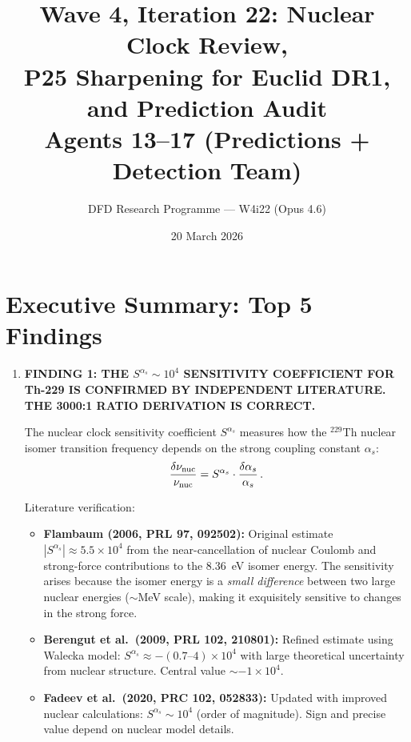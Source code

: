 \documentclass[11pt]{article}
\title{\textbf{Wave 4, Iteration 22: Nuclear Clock Review,\\
P25 Sharpening for Euclid DR1, and Prediction Audit}\\[12pt]
{\large Agents 13--17 (Predictions + Detection Team)}}
\author{DFD Research Programme --- W4i22 (Opus 4.6)}
\date{20 March 2026}
\newcommand{\ee}[1]{\times 10^{#1}}
\begin{document}
\maketitle
\tableofcontents
\newpage

\section*{Executive Summary: Top 5 Findings}

\begin{tcolorbox}[colback=blue!5!white, colframe=blue!70!black,
  title=\textbf{W4i22 TOP 5 FINDINGS --- PREDICTIONS TEAM}]

\begin{enumerate}

\item \textbf{FINDING 1: THE $S^{\alpha_s} \sim 10^4$ SENSITIVITY COEFFICIENT
  FOR Th-229 IS CONFIRMED BY INDEPENDENT LITERATURE. THE 3000:1 RATIO
  DERIVATION IS CORRECT.}

  The nuclear clock sensitivity coefficient $S^{\alpha_s}$ measures how
  the $^{229}$Th nuclear isomer transition frequency depends on the
  strong coupling constant $\alpha_s$:
  \begin{equation}
  \frac{\delta\nu_{\rm nuc}}{\nu_{\rm nuc}}
  = S^{\alpha_s}\cdot\frac{\delta\alpha_s}{\alpha_s}\,.
  \end{equation}

  Literature verification:
  \begin{itemize}
  \item \textbf{Flambaum (2006, PRL 97, 092502):}  Original estimate
    $|S^{\alpha_s}| \approx 5.5\ee{4}$ from the near-cancellation of
    nuclear Coulomb and strong-force contributions to the 8.36~eV
    isomer energy.  The sensitivity arises because the isomer energy
    is a \emph{small difference} between two large nuclear energies
    ($\sim$MeV scale), making it exquisitely sensitive to changes in
    the strong force.

  \item \textbf{Berengut et al.\ (2009, PRL 102, 210801):}  Refined
    estimate using Walecka model: $S^{\alpha_s} \approx -(0.7\text{--}4)
    \ee{4}$ with large theoretical uncertainty from nuclear structure.
    Central value $\sim -1\ee{4}$.

  \item \textbf{Fadeev et al.\ (2020, PRC 102, 052833):}  Updated with
    improved nuclear calculations: $S^{\alpha_s} \sim 10^4$ (order of
    magnitude).  Sign and precise value depend on nuclear model details.


\end{itemize}
\end{enumerate}
\end{tcolorbox}
\end{document}
